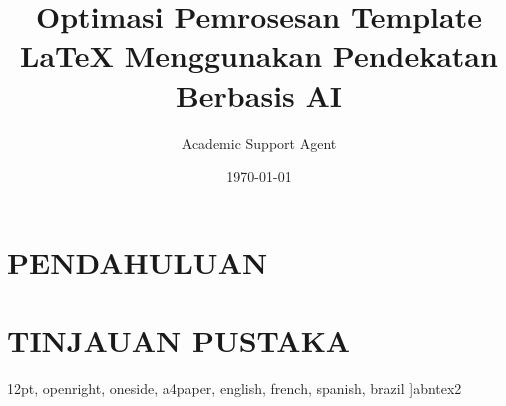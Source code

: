 \documentclass{abntex2}
\title{Optimasi Pemrosesan Template LaTeX Menggunakan Pendekatan Berbasis AI}
\author{Academic Support Agent}
\date{\today}
\begin{document}
\maketitle

\begin{abstract}

\end{abstract}

\chapter{PENDAHULUAN}


\chapter{TINJAUAN PUSTAKA}


	12pt,				%
	openright,			%
	oneside,			%
	a4paper,			%
	english,			%
	french,				%
	spanish,			%
	brazil				%
	]{abntex2}

\usepackage{lmodern}			%
\usepackage[T1]{fontenc}		%
\usepackage[utf8]{inputenc}		%
\usepackage{lastpage}			%
\usepackage{indentfirst}		%
\usepackage{color}				%
\usepackage{graphicx}			%
\usepackage{microtype} 			%
\usepackage{multirow}
\usepackage{url}
\usepackage[output=pdf]{lib/logoLuizRosa}
\usepackage{supertabular}
\renewcommand{\UrlBreaks}{\do\/\do\a\do\b\do\c\do\d\do\e\do\f\do\g\do\h\do\i\do\j\do\k\do\l\do\m\do\n\do\o\do\p\do\q\do\r\do\s\do\t\do\u\do\v\do\w\do\x\do\y\do\z\do\A\do\B\do\C\do\D\do\E\do\F\do\G\do\H\do\I\do\J\do\K\do\L\do\M\do\N\do\O\do\P\do\Q\do\R\do\S\do\T\do\U\do\V\do\W\do\X\do\Y\do\Z}

		
\usepackage{lipsum}				%

\usepackage[brazilian,hyperpageref]{backref}	 %
\usepackage[alf]{abntex2cite}	%
\end{document}
